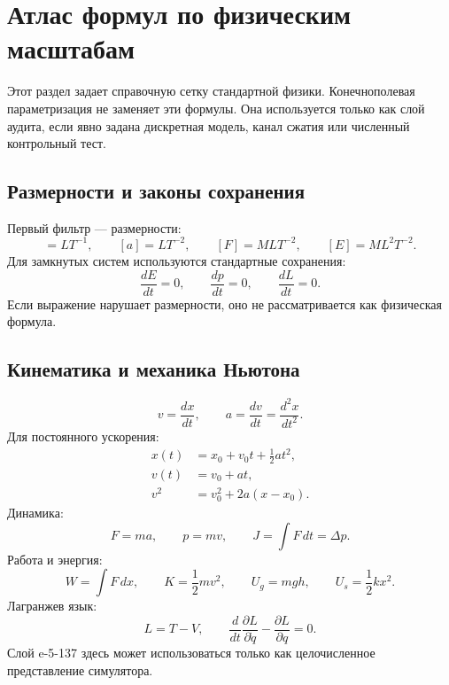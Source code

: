 \documentclass[11pt]{article}
\begin{document}
\section{Атлас формул по физическим масштабам}

Этот раздел задает справочную сетку стандартной физики.  Конечнополевая
параметризация не заменяет эти формулы.  Она используется только как слой
аудита, если явно задана дискретная модель, канал сжатия или численный
контрольный тест.

\subsection{Размерности и законы сохранения}

Первый фильтр — размерности:
\begin{equation}
    [v]=LT^{-1},\qquad
    [a]=LT^{-2},\qquad
    [F]=MLT^{-2},\qquad
    [E]=ML^2T^{-2}.
\end{equation}
Для замкнутых систем используются стандартные сохранения:
\begin{equation}
    \frac{dE}{dt}=0,\qquad
    \frac{dp}{dt}=0,\qquad
    \frac{dL}{dt}=0.
\end{equation}
Если выражение нарушает размерности, оно не рассматривается как физическая
формула.

\subsection{Кинематика и механика Ньютона}

\begin{equation}
    v=\frac{dx}{dt},\qquad
    a=\frac{dv}{dt}=\frac{d^2x}{dt^2}.
\end{equation}
Для постоянного ускорения:
\begin{align}
    x(t)&=x_0+v_0t+\frac{1}{2}at^2,\\
    v(t)&=v_0+at,\\
    v^2&=v_0^2+2a(x-x_0).
\end{align}
Динамика:
\begin{equation}
    F=ma,\qquad p=mv,\qquad J=\int F\,dt=\Delta p.
\end{equation}
Работа и энергия:
\begin{equation}
    W=\int F\,dx,\qquad
    K=\frac{1}{2}mv^2,\qquad
    U_g=mgh,\qquad
    U_s=\frac{1}{2}kx^2.
\end{equation}
Лагранжев язык:
\begin{equation}
    L=T-V,\qquad
    \frac{d}{dt}\frac{\partial L}{\partial \dot{q}}
    -\frac{\partial L}{\partial q}=0.
\end{equation}
Слой e-5-137 здесь может использоваться только как целочисленное
представление симулятора.
\end{document}
